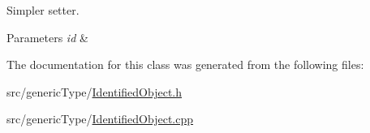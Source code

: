 Simpler setter. 


\begin{DoxyParams}{Parameters}
{\em id} & \\
\hline
\end{DoxyParams}


The documentation for this class was generated from the following files\+:\begin{DoxyCompactItemize}
\item 
src/generic\+Type/\hyperlink{IdentifiedObject_8h}{Identified\+Object.\+h}\item 
src/generic\+Type/\hyperlink{IdentifiedObject_8cpp}{Identified\+Object.\+cpp}\end{DoxyCompactItemize}
